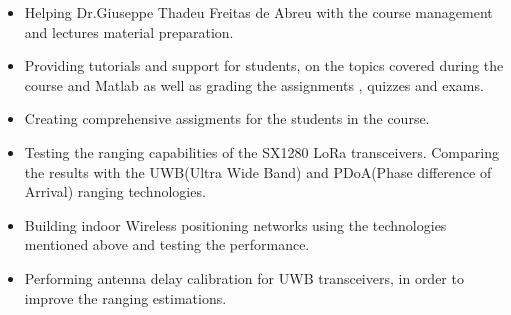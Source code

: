 \documentclass[10pt,a4paper]{altacv}
\begin{document}
\begin{itemize}
\item Helping Dr.Giuseppe Thadeu Freitas de Abreu with the course management and lectures material preparation. 
\item Providing tutorials and support for students,  on the topics covered during the course and Matlab as well as grading the assignments , quizzes and exams.
\item Creating comprehensive assigments for the students in the course. 
\end{itemize}


\begin{itemize}
\item Testing the ranging capabilities of the SX1280 LoRa transceivers. Comparing the results with the UWB(Ultra Wide Band) and PDoA(Phase difference of Arrival) ranging technologies.
\item Building indoor Wireless positioning networks using the technologies mentioned above and testing the performance. 
\item Performing antenna delay calibration for UWB transceivers, in order to improve the ranging estimations. 
\end{itemize}

\divider


\end{document}
